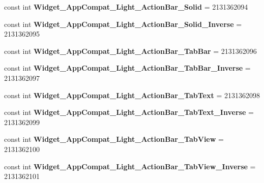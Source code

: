 \begin{DoxyCompactItemize}
const int {\bfseries Widget\+\_\+\+App\+Compat\+\_\+\+Light\+\_\+\+Action\+Bar\+\_\+\+Solid} = 2131362094
\item 
\mbox{\label{class_sample_app_1_1_droid_1_1_resource_1_1_style_a6fd7f17aade3e623a5d45ec7aeffead2}} 
const int {\bfseries Widget\+\_\+\+App\+Compat\+\_\+\+Light\+\_\+\+Action\+Bar\+\_\+\+Solid\+\_\+\+Inverse} = 2131362095
\item 
\mbox{\label{class_sample_app_1_1_droid_1_1_resource_1_1_style_adec98cef8a4b73ee3bcb188e4bc24bed}} 
const int {\bfseries Widget\+\_\+\+App\+Compat\+\_\+\+Light\+\_\+\+Action\+Bar\+\_\+\+Tab\+Bar} = 2131362096
\item 
\mbox{\label{class_sample_app_1_1_droid_1_1_resource_1_1_style_a3d7141da1598b740c0c9ae95da9c6514}} 
const int {\bfseries Widget\+\_\+\+App\+Compat\+\_\+\+Light\+\_\+\+Action\+Bar\+\_\+\+Tab\+Bar\+\_\+\+Inverse} = 2131362097
\item 
\mbox{\label{class_sample_app_1_1_droid_1_1_resource_1_1_style_a998d39cfe96681ff4afac19c9705bd08}} 
const int {\bfseries Widget\+\_\+\+App\+Compat\+\_\+\+Light\+\_\+\+Action\+Bar\+\_\+\+Tab\+Text} = 2131362098
\item 
\mbox{\label{class_sample_app_1_1_droid_1_1_resource_1_1_style_a4699bab0669c5b0d3a6f37f4884eff1f}} 
const int {\bfseries Widget\+\_\+\+App\+Compat\+\_\+\+Light\+\_\+\+Action\+Bar\+\_\+\+Tab\+Text\+\_\+\+Inverse} = 2131362099
\item 
\mbox{\label{class_sample_app_1_1_droid_1_1_resource_1_1_style_a9c58fd5b1b82f82143c8891ad99b68c8}} 
const int {\bfseries Widget\+\_\+\+App\+Compat\+\_\+\+Light\+\_\+\+Action\+Bar\+\_\+\+Tab\+View} = 2131362100
\item 
\mbox{\label{class_sample_app_1_1_droid_1_1_resource_1_1_style_a762d0ed86922e32024c353911e341137}} 
const int {\bfseries Widget\+\_\+\+App\+Compat\+\_\+\+Light\+\_\+\+Action\+Bar\+\_\+\+Tab\+View\+\_\+\+Inverse} = 2131362101

\end{DoxyCompactItemize}

